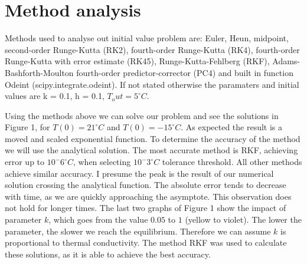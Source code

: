 \documentclass[12pt, a4paper]{article}
\begin{document}
\section{Method analysis}
Methods used to analyse out initial value problem are: Euler, Heun, midpoint, second-order Runge-Kutta (RK2), fourth-order Runge-Kutta (RK4), fourth-order Runge-Kutta with error estimate (RK45), Runge-Kutta-Fehlberg (RKF), Adams-Bashforth-Moulton fourth-order predictor-corrector (PC4) and built in function Odeint ({\sc scipy.integrate.odeint}). If not stated otherwise the paramaters and initial values are k = 0.1, h = 0.1, $T_out = 5^{\circ}C$.

Using the methods above we can solve our problem and see the solutions in Figure 1, for $T(0) = 21^{\circ}C$ and $T(0) = -15^{\circ}C$. As expected the result is a moved and scaled exponential function. To determine the accuracy of the method we will use the analytical solution. The most accurate method is RKF, achieving error up to $10^-6 ^{\circ}C$, when selecting $10^-3 ^{\circ}C$ tolerance threshold. All other methods achieve similar accuracy. I presume the peak is the result of our numerical solution crossing the analytical function. The absolute error tends to decrease with time, as we are quickly approaching the asymptote. This observation does not hold for longer times. The last two graphs of Figure 1 show the impact of parameter $k$, which goes from the value $0.05$ to $1$ (yellow to violet). The lower the parameter, the slower we reach the equilibrium. Therefore we can assume $k$ is proportional to thermal conductivity. The method RKF was used to calculate these solutions, as it is able to achieve the best accuracy.
\end{document}
